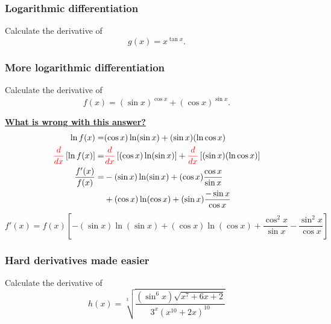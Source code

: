 \documentclass[14pt]{beamer}
\begin{document}
	\begin{frame}[t]
		\frametitle{Logarithmic differentiation}

		\vspace{5mm}
		\begin{block}{}
			Calculate the derivative of
			\[
				g(x) = x^{\tan x}.
			\]
		\end{block}
	\end{frame}


	\begin{frame}[t]
		\fontsize{13}{13}\selectfont
		\frametitle{More logarithmic differentiation}

		\begin{block}{}
			Calculate the derivative of
			\[
				f(x) = \left( \sin x \right)^{\cos x}+ \left( \cos x \right)^{\sin x}.
			\]
		\end{block}

		\vfill

		{\bfseries \underline{What is wrong with this answer?}}
		\begin{align*}
			\ln f(x) =                                          & (\cos x) \ln ( \sin x )+ ( \sin x ) ( \ln \cos x )                                                                                   \\
			{\color{red} \frac{d}{dx}}\left[ \ln f(x) \right] = & {\color{red} \frac{d}{dx}}\left[ (\cos x) \ln ( \sin x ) \right] +{\color{red} \frac{d}{dx}}\left[ ( \sin x ) ( \ln \cos x ) \right] \\
			\frac{f'(x)}{f(x)}=                                 & - ( \sin x ) \ln (\sin x) + (\cos x ) \frac{\cos x}{\sin x}                                                                          \\
			                                                    & + ( \cos x ) \ln (\cos x) + (\sin x ) \frac{- \sin x}{\cos x}
		\end{align*}
		\[
			{f'(x) = f(x) \left[ - (\sin x) \ln(\sin x) + (\cos x) \ln (\cos x) + \frac{\cos^{2}x}{\sin x} - \frac{\sin^{2}x}{\cos x} \right]}
		\]
	\end{frame}

	\begin{frame}[t]
		\frametitle{Hard derivatives made easier}

		\vspace{5mm}
		\begin{block}{}
			Calculate the derivative of
			\[
				h(x) = \sqrt[3]{\frac{\left( \sin^{6}x \right) \sqrt{x^7+6x+2}}{3^{x}\left(x^{10}+2x\right)^{10}}}
			\]
		\end{block}
	\end{frame}
\end{document}
